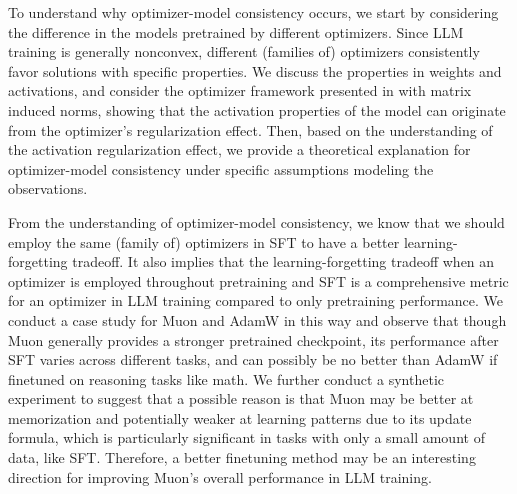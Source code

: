 \documentclass{article}
\theoremstyle{remark}
\begin{document}
To understand why optimizer-model consistency occurs, we start by considering the difference in the models pretrained by different optimizers. 
Since LLM training is generally nonconvex, different (families of) optimizers consistently favor solutions with specific properties.
We discuss the properties in weights and activations, and consider the optimizer framework presented in \citet{pethick2025training} with matrix induced norms, showing that the activation properties of the model can originate from the optimizer's regularization effect. Then, based on the understanding of the activation regularization effect, we provide a theoretical explanation for optimizer-model consistency under specific assumptions modeling the observations.

From the understanding of optimizer-model consistency, we know that we should employ the same (family of) optimizers in SFT to have a better learning-forgetting tradeoff.
It also implies that the learning-forgetting tradeoff when an optimizer is employed throughout pretraining and SFT is a comprehensive metric for an optimizer in LLM training compared to only pretraining performance.
We conduct a case study for Muon and AdamW in this way and observe that though Muon generally provides a stronger pretrained checkpoint, its performance after SFT varies across different tasks, and can possibly be no better than AdamW if finetuned on reasoning tasks like math. 
We further conduct a synthetic experiment to suggest that a possible reason is that Muon may be better at memorization and potentially weaker at learning patterns due to its update formula, which is particularly significant in tasks with only a small amount of data, like SFT.
Therefore, a better finetuning method may be an interesting direction for improving Muon's overall performance in LLM training.
\end{document}
